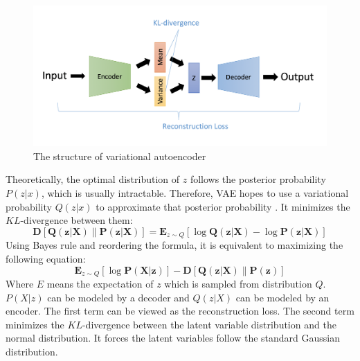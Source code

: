 \begin{figure}[htb!]
    \centering
    \includegraphics[width=1\textwidth]{figures/myfigures/vae.png}
    \caption{The structure of variational autoencoder}
    \label{modelvae}
\end{figure}

Theoretically, the optimal distribution of $z$ follows the posterior probability $P(z|x)$, which is usually intractable. Therefore, VAE hopes to use a variational probability $Q(z|x)$ to approximate that posterior probability \cite{doersch2016tutorial}. It minimizes the $KL$-divergence between them:
\begin{equation}
\boldsymbol{D}[\boldsymbol{Q}(\boldsymbol{z} | \boldsymbol{X}) \| \boldsymbol{P}(\boldsymbol{z} | \boldsymbol{X})]=\mathbf{E}_{z \sim Q}[\log \boldsymbol{Q}(\boldsymbol{z} | \boldsymbol{X})-\log \boldsymbol{P}(\boldsymbol{z} | \boldsymbol{X})]
\end{equation}
Using Bayes rule and reordering the formula, it is equivalent to maximizing the following equation:
\begin{equation}
\mathbf{E}_{z \sim Q}[\log \boldsymbol{P}(\boldsymbol{X} | \boldsymbol{z})]-\boldsymbol{D}[\boldsymbol{Q}(\boldsymbol{z} | \boldsymbol{X}) \| \boldsymbol{P}(\boldsymbol{z})]
\end{equation}
Where $E$ means the expectation of $z$ which is sampled from distribution $Q$. $P(X|z)$ can be modeled by a decoder and $Q(z|X)$ can be modeled by an encoder. The first term can be viewed as the reconstruction loss. The second term minimizes the $KL$-divergence between the latent variable distribution and the normal distribution. It forces the latent variables follow the standard Gaussian distribution.

